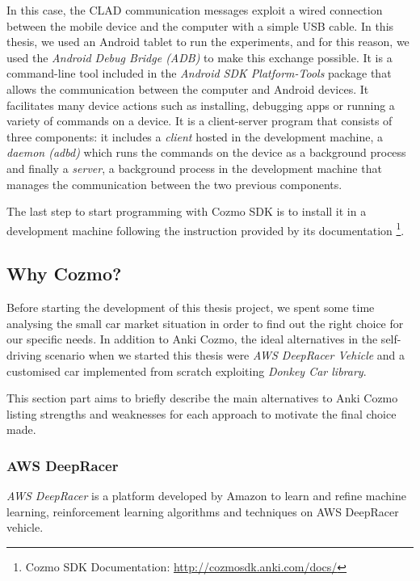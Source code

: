 In this case, the CLAD communication messages exploit a wired connection between the mobile device and the computer with a simple USB cable.
In this thesis, we used an Android tablet to run the experiments, and for this reason, we used the \textit{Android Debug Bridge (ADB)} to make this exchange possible.
It is a command-line tool included in the \textit{Android SDK Platform-Tools} package that allows the communication between the computer and Android devices.
It facilitates many device actions such as installing, debugging apps or running a variety of commands on a device.
It is a client-server program that consists of three components: it includes a \textit{client} hosted in the development machine, a \textit{daemon (adbd)} which runs the commands on the device as a background process and finally a \textit{server}, a background process in the development machine that manages the communication between the two previous components.

The last step to start programming with Cozmo SDK is to install it in a development machine following the instruction provided by its documentation \footnote{Cozmo SDK Documentation: \href{http://cozmosdk.anki.com/docs/index.html}{http://cozmosdk.anki.com/docs/}}.


\subsection{Why Cozmo?}

Before starting the development of this thesis project, we spent some time analysing the small car market situation in order to find out the right choice for our specific needs.
In addition to Anki Cozmo, the ideal alternatives in the self-driving scenario when we started this thesis were \textit{AWS DeepRacer Vehicle} and a customised car implemented from scratch exploiting \textit{Donkey \textregistered
	Car library}.

This section part aims to briefly describe the main alternatives to Anki Cozmo listing strengths and weaknesses for each approach to motivate the final choice made.

\subsubsection{AWS DeepRacer}

\textit{AWS DeepRacer} is a platform developed by Amazon to learn and refine machine learning, reinforcement learning algorithms and techniques on AWS DeepRacer vehicle.

